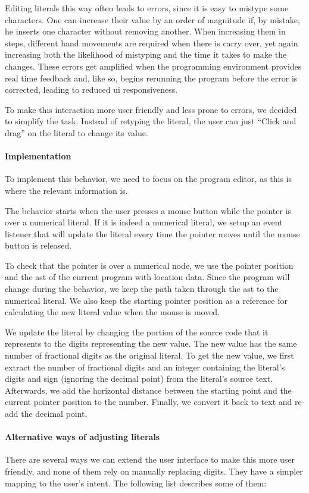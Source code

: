 Editing literals this way often leads to errors, since it is easy to mistype some characters.
One can increase their value by an order of magnitude if, by mistake, he inserts one character without removing another.
When increasing them in steps, different hand movements are required when there is carry over, yet again increasing both the likelihood of mistyping and the time it takes to make the changes.
These errors get amplified when the programming environment provides real time feedback and, like so, begins rerunning the program before the error is corrected, leading to reduced \gls{ui} responsiveness.

To make this interaction more user friendly and less prone to errors, we decided to simplify the task.
Instead of retyping the literal, the user can just ``Click and drag'' on the literal to change its value.

\paragraph{Implementation}
To implement this behavior, we need to focus on the program editor, as this is where the relevant information is.

The behavior starts when the user presses a mouse button while the pointer is over a numerical literal.
If it is indeed a numerical literal, we setup an event listener that will update the literal every time the pointer moves until the mouse button is released.

To check that the pointer is over a numerical node, we use the pointer position and the \gls{ast} of the current program with location data.
Since the program will change during the behavior, we keep the path taken through the \gls{ast} to the numerical literal.
We also keep the starting pointer position as a reference for calculating the new literal value when the mouse is moved.

We update the literal by changing the portion of the source code that it represents to the digits representing the new value.
The new value has the same number of fractional digits as the original literal.
To get the new value, we first extract the number of fractional digits and an integer containing the literal's digits and sign (ignoring the decimal point) from the literal's source text.
Afterwards, we add the horizontal distance between the starting point and the current pointer position to the number.
Finally, we convert it back to text and re-add the decimal point.

\paragraph{Alternative ways of adjusting literals}
There are several ways we can extend the user interface to make this more user friendly, and none of them rely on manually replacing digits.
They have a simpler mapping to the user's intent.
The following list describes some of them:

